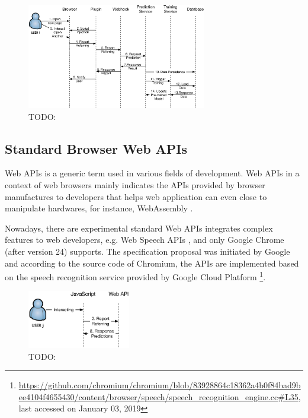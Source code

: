 \begin{figure}[H]
    \centering
    \includegraphics[width=0.7\textwidth]{figures/arch}
    \caption{TODO:}
    \label{fig:arch}
\end{figure}

\subsection{Standard Browser Web APIs}

Web APIs is a generic term used in various fields of development.
Web APIs in a context of web browsers mainly indicates the APIs provided
by browser manufactures to developers that helps web application can even close
to manipulate hardwares, for instance, WebAssembly \cite{w3c2018ws}.

Nowadays, there are experimental standard Web APIs integrates complex features to web developers, e.g. Web Speech APIs \cite{mozilla2019speech}, and only Google Chrome (after version 24) supports. The specification proposal was initiated by Google and according to the source code of Chromium, the APIs are implemented based on the speech recognition service provided by Google Cloud Platform \footnote{\url{https://github.com/chromium/chromium/blob/83928864c18362a4b0f84bad9bee4104f4655430/content/browser/speech/speech\_recognition\_engine.cc\#L35}, last accessed on January 03, 2019}.

\begin{figure}[H]
    \centering
    \includegraphics[width=0.4\textwidth]{figures/webapi}
    \caption{TODO:}
    \label{fig:webapi}
\end{figure}


\cleardoublepage